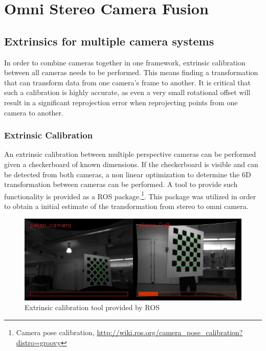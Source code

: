 \chapter{Omni Stereo Camera Fusion}
\label{chapter:omni_stereo_fusion}

\section{Extrinsics for multiple camera systems}

In order to combine cameras together in one framework, extrinsic calibration between all cameras needs to be performed.  This means finding a transformation that can transform data from one camera's frame to another.  It is critical that such a calibration is highly accurate, as even a very small rotational offset will result in a significant reprojection error when reprojecting points from one camera to another.

\subsection{Extrinsic Calibration}


An extrinsic calibration between multiple perspective cameras can be performed given a checkerboard of known dimensions.  If the checkerboard is visible and can be detected from both cameras, a non linear optimization to determine the 6D transformation between cameras can be performed.  A tool to provide such functionality is provided as a ROS package.\footnote{Camera pose calibration, \url{http://wiki.ros.org/camera_pose_calibration?distro=groovy}}.  This package was utilized in order to obtain a initial estimate of the transformation from stereo to omni camera.

\begin{figure}[h!]
  \centering
    \includegraphics[width=1.0\textwidth]{chapters/images/extrinsic_cal_1}
  \caption{Extrinsic calibration tool provided by ROS}
  \label{fig:extrinsic_cal_1}
\end{figure}

